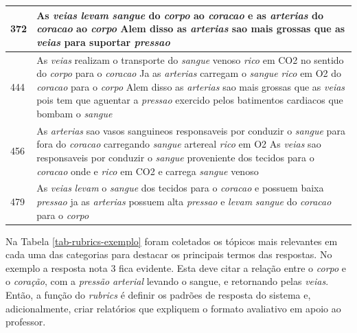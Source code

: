 \begin{table}[!h]
\begin{tabular}{ p{2cm} | p{14cm}}
372 & As \textit{veias} \textit{levam} \textit{sangue} do \textit{corpo} ao \textit{coracao} e as \textit{arterias} do \textit{coracao} ao \textit{corpo} Alem disso as \textit{arterias} sao mais grossas que as \textit{veias} para suportar \textit{pressao}\\ \hline
444 & As \textit{veias} realizam o transporte do \textit{sangue} venoso \textit{rico} em CO2 no sentido do \textit{corpo} para o \textit{coracao} Ja as \textit{arterias} carregam o \textit{sangue} \textit{rico} em O2 do \textit{coracao} para o \textit{corpo} Alem disso as \textit{arterias} sao mais grossas que as \textit{veias} pois tem que aguentar a \textit{pressao} exercido pelos batimentos cardiacos que bombam o \textit{sangue}\\ \hline
456 & As \textit{arterias} sao vasos sanguineos responsaveis por conduzir o \textit{sangue} para fora do \textit{coracao} carregando \textit{sangue} artereal \textit{rico} em O2 As \textit{veias} sao responsaveis por conduzir o \textit{sangue} proveniente dos tecidos para o \textit{coracao} onde e \textit{rico} em CO2 e carrega \textit{sangue} venoso\\ \hline
479 & As \textit{veias} \textit{levam} o \textit{sangue} dos tecidos para o \textit{coracao} e possuem baixa \textit{pressao} ja as \textit{arterias} possuem alta \textit{pressao} e \textit{levam} \textit{sangue} do \textit{coracao} para o \textit{corpo}\\ \hline
\hline
\end{tabular}
\end{table}

Na Tabela \ref{tab-rubrics-exemplo} foram coletados os tópicos mais relevantes em cada uma das categorias para destacar os principais termos das respostas. No exemplo a resposta nota 3 fica evidente. Esta deve citar a relação entre o \textit{corpo} e o \textit{coração}, com a \textit{pressão} \textit{arterial} levando o sangue, e retornando pelas \textit{veias}. Então, a função do \textit{rubrics} é definir os padrões de resposta do sistema e, adicionalmente, criar relatórios que expliquem o formato avaliativo em apoio ao professor.

